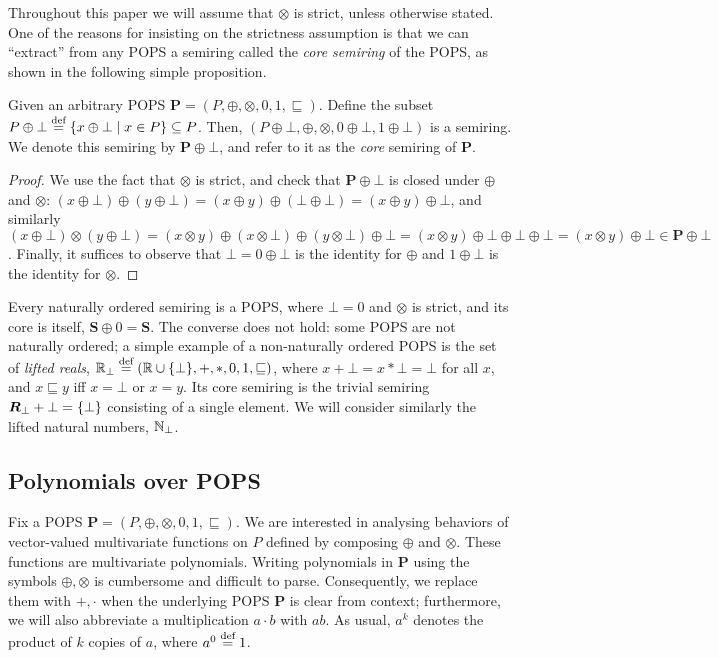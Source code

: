 Throughout this paper we will assume that $\otimes$ is strict,
unless otherwise stated.
One of the reasons for insisting on the strictness assumption is that
we can ``extract'' from any POPS a semiring called the {\em core semiring}
 of the POPS,
as shown in the following simple proposition.

\begin{prop} \label{prop:s:plus:bot} Given an arbitrary POPS
  $\bm P=(P,\oplus,\otimes,0,1,\sqsubseteq)$.  Define the subset
  $P\oplus \bot \stackrel{\text{def}}{=} \{{x\oplus\bot}\mid{x \in P}\} \subseteq P$.
  Then, $(P\oplus \bot, \oplus, \otimes, 0\oplus \bot, 1 \oplus \bot)$
  is a semiring.  We denote this semiring by $\bm P \oplus \bot$, and
  refer to it as the {\em core} semiring of $\bm P$.
\end{prop}
%
\begin{proof}
  We use the fact that $\otimes$ is strict, and check that
  $\bm P\oplus\bot$ is closed under $\oplus$ and $\otimes$:
  $(x\oplus\bot)\oplus(y\oplus\bot)=(x\oplus
  y)\oplus(\bot\oplus\bot)=(x\oplus y)\oplus\bot$, and similarly
  $(x\oplus\bot)\otimes(y\oplus\bot)=(x\otimes y)\oplus (x\otimes\bot)
  \oplus (y\otimes \bot) \oplus\bot = (x\otimes
  y)\oplus\bot\oplus\bot\oplus\bot=(x\otimes y)\oplus\bot \in \bm P
  \oplus \bot$.  Finally, it suffices to observe that $\bot= 0\oplus\bot$ is the identity
  for $\oplus$ and $1\oplus\bot$ is the identity for $\otimes$.
\end{proof}

Every naturally ordered semiring is a POPS, where $\bot = 0$ and
$\otimes$ is strict, and its core is itself, $\bm S \oplus 0 = \bm S$.
The converse does not hold: some POPS are not naturally ordered; a
simple example of a non-naturally ordered POPS is the set of {\em lifted
  reals},
$\mathbb R_\bot \stackrel{\text{def}}{=} (\mathbb R \cup \{\bot\}, +, *, 0, 1, \sqsubseteq)$, where
$x+\bot = x*\bot = \bot$ for all $x$, and $x \sqsubseteq y$ iff
$x = \bot$ or $x=y$.  Its core semiring is the trivial semiring
$\bm R_\bot + \bot = \{\bot\}$ consisting of a single element.  We
will consider similarly the lifted natural numbers, $\mathbb N_\bot$.

\subsection{Polynomials over POPS}
\label{subsec:polynomial}


Fix a POPS $\bm P = (P, \oplus, \otimes, 0, 1, \sqsubseteq)$.
We are interested in analysing behaviors of vector-valued multivariate functions on $P$
defined by composing $\oplus$ and $\otimes$.
These functions are multivariate polynomials.
Writing polynomials in $\bm P$ using the symbols $\oplus, \otimes$
is cumbersome and difficult to parse. Consequently, we replace them with $+, \cdot$ when the underlying
POPS $\bm P$ is clear from context; furthermore, we will also
abbreviate a multiplication $a\cdot b$ with $ab$.  As usual, $a^k$
denotes the product of $k$ copies of $a$, where $a^0 \stackrel{\text{def}}{=} 1$.

